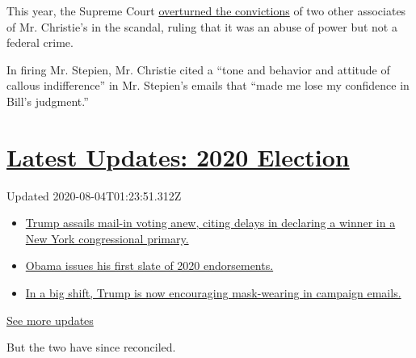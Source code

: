 This year, the Supreme Court
\href{https://www.nytimes3xbfgragh.onion/2020/05/07/us/supreme-court-bridgegate.html}{overturned
the convictions} of two other associates of Mr. Christie's in the
scandal, ruling that it was an abuse of power but not a federal crime.

In firing Mr. Stepien, Mr. Christie cited a ``tone and behavior and
attitude of callous indifference'' in Mr. Stepien's emails that ``made
me lose my confidence in Bill's judgment.''

\hypertarget{latest-updates-2020-election}{%
\section{\texorpdfstring{\href{https://www.nytimes3xbfgragh.onion/2020/08/03/us/elections/biden-vs-trump.html?action=click\&pgtype=Article\&state=default\&region=MAIN_CONTENT_1\&context=storylines_live_updates}{Latest
Updates: 2020
Election}}{Latest Updates: 2020 Election}}\label{latest-updates-2020-election}}

Updated 2020-08-04T01:23:51.312Z

\begin{itemize}
\tightlist
\item
  \href{https://www.nytimes3xbfgragh.onion/2020/08/03/us/elections/biden-vs-trump.html?action=click\&pgtype=Article\&state=default\&region=MAIN_CONTENT_1\&context=storylines_live_updates\#link-6494b448}{Trump
  assails mail-in voting anew, citing delays in declaring a winner in a
  New York congressional primary.}
\item
  \href{https://www.nytimes3xbfgragh.onion/2020/08/03/us/elections/biden-vs-trump.html?action=click\&pgtype=Article\&state=default\&region=MAIN_CONTENT_1\&context=storylines_live_updates\#link-3de249e6}{Obama
  issues his first slate of 2020 endorsements.}
\item
  \href{https://www.nytimes3xbfgragh.onion/2020/08/03/us/elections/biden-vs-trump.html?action=click\&pgtype=Article\&state=default\&region=MAIN_CONTENT_1\&context=storylines_live_updates\#link-54e34d20}{In
  a big shift, Trump is now encouraging mask-wearing in campaign
  emails.}
\end{itemize}

\href{https://www.nytimes3xbfgragh.onion/2020/08/03/us/elections/biden-vs-trump.html?action=click\&pgtype=Article\&state=default\&region=MAIN_CONTENT_1\&context=storylines_live_updates}{See
more updates}

But the two have since reconciled.

